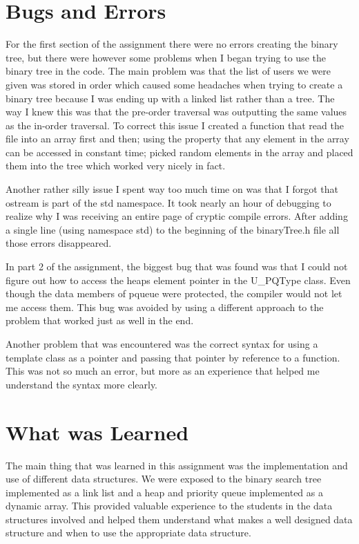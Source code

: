 \documentclass[pdftex, 12pt]{article}
\begin{document}
\section{Bugs and Errors}

For the first section of the assignment there were no errors creating the binary tree, but there were however some
problems when I began trying to use the binary tree in the code.  The main problem was that the list of users we were
given was stored in order which caused some headaches when trying to create a binary tree because I was ending up with a
linked list rather than a tree.  The way I knew this was that the pre-order traversal was outputting the same values as
the in-order traversal.  To correct this issue I created a function that read the file into an array first and then;
using the property that any element in the array can be accessed in constant time; picked random elements in the array
and placed them into the tree which worked very nicely in fact.

Another rather silly issue I spent way too much time on was that I forgot that ostream is part of the std namespace. It
took nearly an hour of debugging to realize why I was receiving an entire page of cryptic compile errors.  After adding a
single line (using namespace std) to the beginning of the binaryTree.h file all those errors disappeared.

In part 2 of the assignment, the biggest bug that was found was that I could not figure out how to access the heaps
element pointer in the U\_PQType class. Even though the data members of pqueue were protected, the compiler would not
let me access them. This bug was avoided by using a different approach to the problem that worked just as well in the
end. 

Another problem that was encountered was the correct syntax for using a template class as a pointer and passing that
pointer by reference to a function. This was not so much an error, but more as an experience that helped me understand
the syntax more clearly. 

\section{What was Learned}

The main thing that was learned in this assignment was the implementation and use of different data structures. We were
exposed to the binary search tree implemented as a link list and a heap and priority queue implemented as a dynamic
array. This provided valuable experience to the students in the data structures involved and helped them understand what
makes a well designed data structure and when to use the appropriate data structure. 
\end{document}
